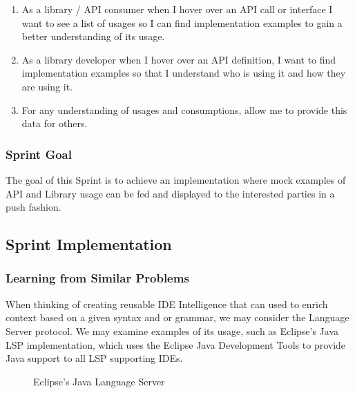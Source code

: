 \begin{enumerate}

	\item  As a library / API consumer when I hover over an API call or interface I want to see a list of usages so I can find implementation examples to gain a better  understanding of its usage.
	
	\item As a library developer when I hover over an API definition, I want to find implementation examples so that I understand who is using it and how they are using it. 
	
	\item For any understanding of usages and consumptions, allow me to provide this data for others.
	
\end{enumerate}

\subsubsection{Sprint  Goal}

The goal of this Sprint is to achieve an implementation where mock examples of API and Library usage can be fed and displayed to the interested parties in a push fashion.

\subsection{Sprint Implementation}

\subsubsection{Learning from Similar Problems}

When thinking of creating reusable IDE Intelligence that can used to enrich context based on a given syntax and or grammar, we may consider the Language Server protocol. We may examine examples of its usage, such as Eclipse's Java LSP implementation, which uses the Eclipse Java Development Tools to provide Java support to all LSP supporting IDEs.

\begin{figure}[h!]


\caption{Eclipse's Java Language Server}

\end{figure}

